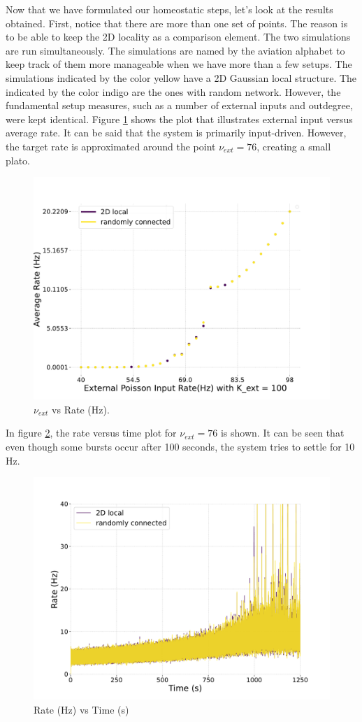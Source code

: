 \documentclass[a4paper,12pt]{article}
\begin{document}
Now that we have formulated our homeostatic steps, let's look at the results obtained. First, notice that there are more than one set of points. The reason is to be able to keep the 2D locality as a comparison element. The two simulations are run simultaneously. The simulations are named by the aviation alphabet to keep track of them more manageable when we have more than a few setups. The simulations indicated by the color yellow have a 2D Gaussian local structure. The indicated by the color indigo are the ones with random network. However, the fundamental setup measures, such as a number of external inputs and outdegree, were kept identical. Figure \ref{charlie} shows the plot that illustrates external input versus average rate. It can be said that the system is primarily input-driven. However, the target rate is approximated around the point $\nu_{ext} = 76$, creating a small plato. 
\begin{figure}[H] 
    \centering
    \includegraphics[width=0.8\linewidth]{nuext_vs_activity_charlie_legended.pdf}
    \caption{$\nu_{ext}$ vs Rate (Hz).}
    \label{charlie}
\end{figure}
In figure \ref{charlie76ratevstime}, the rate versus time plot for $\nu_{ext} = 76$ is shown. It can be seen that even though some bursts occur after 100 seconds, the system tries to settle for 10 Hz.
\begin{figure}[H] 
    \centering
    \includegraphics[width=0.8\linewidth]{nu_ext_76rate_over_time_homeostasis.pdf}
    \caption{Rate (Hz) vs Time (s)}
    \label{charlie76ratevstime}
\end{figure}
\end{document}
